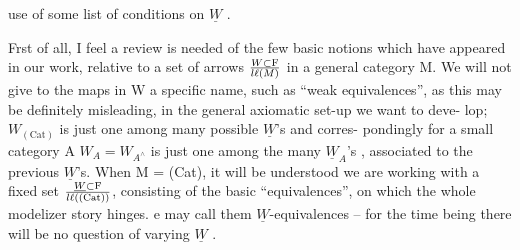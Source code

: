 use of some list of conditions on $\underline{W}$ .

Frst of all, I feel a review is needed of the 
few basic notions which have appeared in our work, relative to a set
of arrows $W\subset \mathrm{F}\over{l}{\ell}(M)$ in a general category M. We will not give to the
maps in W a specific name, such as ``weak equivalences'', as this may be
definitely misleading, in the general axiomatic set-up we want to deve-%
lop;  $W_{(\mathrm{Cat})}$ is just one among many possible $\underline{W}$'s  and corres-%
pondingly for a small category A\over[typed]{\unsure{;}}{,} $W_A = W_{A^{\wedge}}$ is just one among the many
$\underline{W}_A$'s , associated to the previous $\underline{W}$'s. When M = (Cat), it will be
understood we are working with a fixed set $\underline{W}\subset \mathrm{F}\over{l}{\ell}((\mathrm{Cat}))$, consisting of
the basic ``equivalences'', on which the whole modelizer story hinges.
e may call them $\underline{W}$-equivalences -- for the time being there will be no
question of varying $\underline{W}$ .

